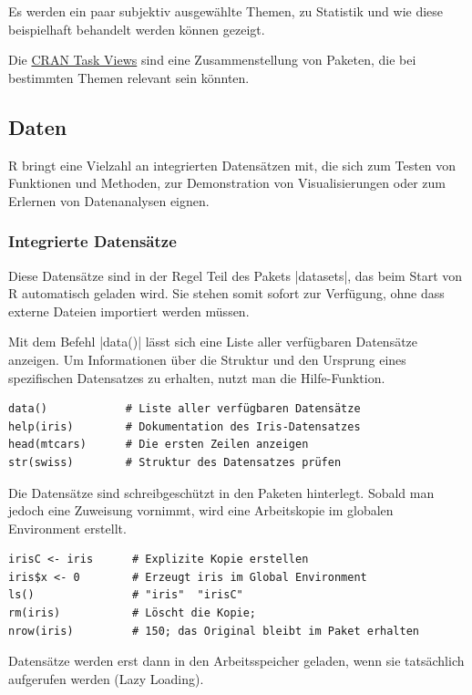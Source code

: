 \documentclass[10pt,twocolumn]{scrartcl}
\renewcommand{\lstinline}{\mycoloredinline}
\begin{document}
Es werden ein paar subjektiv ausgewählte Themen, zu Statistik und wie diese beispielhaft behandelt werden können gezeigt.

Die \href{https://cran.r-project.org/web/views/}{CRAN Task Views} sind eine Zusammenstellung von Paketen, die bei bestimmten Themen relevant sein könnten.

\subsection{Daten}

R bringt eine Vielzahl an integrierten Datensätzen mit, die sich zum Testen von Funktionen und Methoden, zur Demonstration von Visualisierungen oder zum Erlernen von Datenanalysen eignen.

\subsubsection{Integrierte Datensätze}

Diese Datensätze sind in der Regel Teil des Pakets \lstinline|datasets|, das beim Start von R automatisch geladen wird. Sie stehen somit sofort zur Verfügung, ohne dass externe Dateien importiert werden müssen.

Mit dem Befehl \lstinline|data()| lässt sich eine Liste aller verfügbaren Datensätze anzeigen. Um Informationen über die Struktur und den Ursprung eines spezifischen Datensatzes zu erhalten, nutzt man die Hilfe-Funktion.

\begin{lstlisting}
data()            # Liste aller verfügbaren Datensätze
help(iris)        # Dokumentation des Iris-Datensatzes
head(mtcars)      # Die ersten Zeilen anzeigen
str(swiss)        # Struktur des Datensatzes prüfen
\end{lstlisting}

Die Datensätze sind schreibgeschützt in den Paketen hinterlegt. Sobald man jedoch eine Zuweisung vornimmt, wird eine Arbeitskopie im globalen Environment erstellt.

\begin{lstlisting}
irisC <- iris      # Explizite Kopie erstellen
iris$x <- 0        # Erzeugt iris im Global Environment
ls()               # "iris"  "irisC"
rm(iris)           # Löscht die Kopie;
nrow(iris)         # 150; das Original bleibt im Paket erhalten
\end{lstlisting}

Datensätze werden erst dann in den Arbeitsspeicher geladen, wenn sie tatsächlich aufgerufen werden (Lazy Loading).
\end{document}
